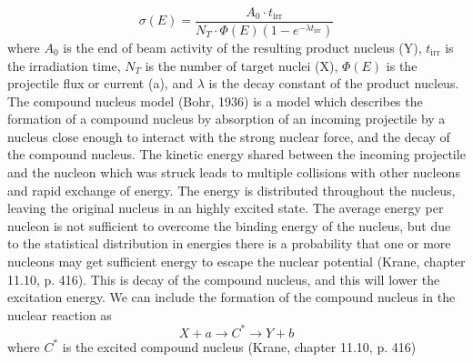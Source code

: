 \begin{equation}
    \sigma(E) = \frac{A_0 \cdot t_\text{irr}}{N_T \cdot \Phi(E)(1-e^{-\lambda t_\text{irr}})}
\end{equation}
\noindent where $A_0$ is the end of beam activity of the resulting product nucleus (Y), $t_\text{irr}$ is the irradiation time, $N_T$ is the number of target nuclei (X), $\Phi(E)$ is the projectile flux or current (a), and $\lambda$ is the decay constant of the product nucleus. \\ 


\noindent The compound nucleus model (Bohr, 1936) is a model which describes the formation of a compound nucleus by absorption of an incoming projectile by a nucleus close enough to interact with the strong nuclear force, and the decay of the compound nucleus. The kinetic energy shared between the incoming projectile and the nucleon which was struck leads to multiple collisions with other nucleons and rapid exchange of energy. The energy is distributed throughout the nucleus, leaving the original nucleus in an highly excited state. The average energy per nucleon is not sufficient to overcome the binding energy of the nucleus, but due to the statistical distribution in energies there is a probability that one or more nucleons may get sufficient energy to escape the nuclear potential (Krane, chapter 11.10, p. 416). This is decay of the compound nucleus, and this will lower the excitation energy. We can include the formation of the compound nucleus in the nuclear reaction as \begin{equation}
    X + a \rightarrow C^* \rightarrow Y + b
\end{equation} where $C^*$ is the excited compound nucleus (Krane, chapter 11.10, p. 416)  \\

